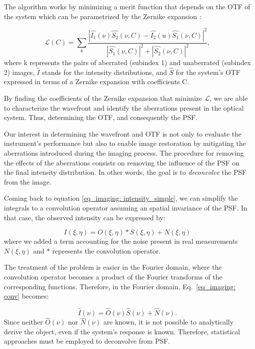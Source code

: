 The algorithm works by minimizing a merit function that depends on the OTF of the system which can be parametrized by the Zernike expansion \citep{pd_cost}: 

\begin{equation}
  \mathcal{L} (C) = \sum _ {k} \frac{|\hat{I_1} (\nu ) \hat{S_2} (\nu , C) - \hat{I_2}(u) \hat{S_1}(\nu , C)| ^2}{|\hat{S_1}(\nu , C)| ^2 + |\hat{S_2}(\nu , C)| ^2} , 
\end{equation}
where k represents the pairs of aberrated (subindex 1) and unaberrated (subindex 2) images, $\hat{I}$ stands for the intensity distributions, and $\hat{S}$ for the system's OTF expressed in terms of a Zernike expansion with coefficients C. 

By finding the coefficients of the Zernike expansion that minimize $\mathcal{L}$, we are able to characterize the wavefront and identify the aberrations present in the optical system. Thus, determining the OTF, and consequently the PSF.

Our interest in determining the wavefront and OTF is not only to evaluate the instrument's performance but also to enable image restoration by mitigating the aberrations introduced during the imaging process. The procedure for removing the effects of the aberrations consists on removing the influence of the PSF on the final intensity distribution. In other words, the goal is to \textit{deconvolve} the PSF from the image.

Coming back to equation \eqref{eq_imaging: intensity_simple}, we can simplify the integrals to a convolution operator assuming an spatial invariance of the PSF. In that case, the observed intensity can be expressed by:

\begin{equation}
  I(\xi, \eta) = O(\xi, \eta) * S(\xi, \eta) + N (\xi, \eta)
  \label{eq_imaging: conv} 
\end{equation}  
where we added a term accounting for the noise present in real measurements $N (\xi, \eta)$ and $ * $ represents the convolution operator. 

The treatment of the problem is easier in the Fourier domain, where the convolution operator becomes a product of the Fourier transforms of the corresponding functions. Therefore, in the Fourier domain, Eq.~\ref{eq_imaging: conv} becomes: 

\begin{equation}
  \hat{I}(\nu ) = \hat{O}(\nu)\hat{S}(\nu)+\hat{N}(\nu).
\end{equation}
Since neither $\hat{O}(\nu)$ nor $\hat{N}(\nu)$ are known, it is not possible to analytically derive the object, even if the system's response is known. Therefore, statistical approaches must be employed to deconvolve from PSF.

